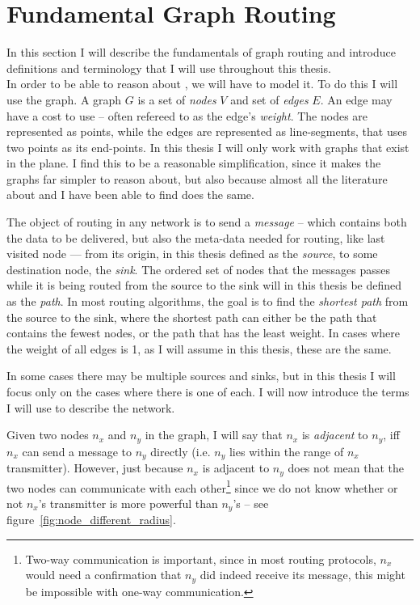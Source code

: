 

\section{Fundamental Graph Routing}
\label{fundamental}
In this section I will describe the fundamentals of graph routing and introduce definitions and terminology that I will use throughout this thesis.\\

In order to be able to reason about \manet, we will have to model it. To do this I will use the graph. A graph $G$ is a set of \emph{nodes} $V$ and set of \emph{edges} $E$. An edge may have a cost to use -- often refereed to as the edge's \emph{weight}. The nodes are represented as points, while the edges are represented as line-segments, that uses two points as its end-points. In this thesis I will only work with graphs that exist in the plane. I find this to be a reasonable simplification, since it makes the graphs far simpler to reason about, but also because almost all the literature about \manet and \anet I have been able to find does the same. 

The object of routing in any network is to send a \emph{message} -- which contains both the data to be delivered, but also the meta-data needed for routing, like last visited node --- from its origin, in this thesis defined as the \emph{source}, to some destination node, the \emph{sink}. The ordered set of nodes that the messages passes while it is being routed from the source to the sink will in this thesis be defined as the \emph{path}. In most routing algorithms, the goal is to find the \emph{shortest path} from the source to the sink, where the shortest path can either be the path that contains the fewest nodes, or the path that has the least weight. In cases where the weight of all edges is 1, as I will assume in this thesis, these are the same. 

In some cases there may be multiple sources and sinks, but in this thesis I will focus only on the cases where there is one of each. I will now introduce the terms I will use to describe the network.


Given two nodes $n_x$ and $n_y$ in the graph, I will say that $n_x$ is \emph{adjacent} to $n_y$, iff $n_x$ can send a message to $n_y$ directly (i.e. $n_y$ lies within the range of $n_x$ transmitter). However, just because $n_x$ is adjacent to $n_y$ does not mean that the two nodes can communicate with each other\footnote{Two-way communication is important, since in most routing protocols, $n_x$ would need a confirmation that $n_y$ did indeed receive its message, this might be impossible with one-way communication.} since we do not know whether or not $n_x$'s transmitter is more powerful than $n_y$'s -- see figure~\ref{fig:node_different_radius}. 

